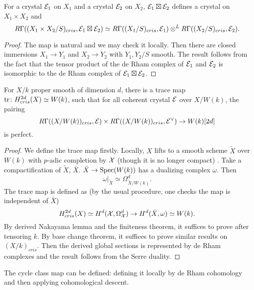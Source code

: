 \begin{theorem}
    For a crystal ${\mathcal {E}}_1$ on $X_1$ and a crystal ${\mathcal {E}}_2$ on $X_2$, 
    ${\mathcal {E}}_1 \boxtimes {\mathcal {E}}_2$ defines a crystal on $X_1\times X_2$ and 
    \[
        R \Gamma ((X_1\times X_2/S)_{cris}, {\mathcal {E}}_1 \boxtimes {\mathcal {E}}_2) \simeq 
        R \Gamma((X_1/S)_{cris}, {\mathcal {E}}_1) \otimes^{L} R \Gamma ((X_2/S)_{cris}, {\mathcal {E}}_2).
    \]
\end{theorem}
\begin{proof}
    The map is natural and we may check it locally. 
    Then there are closed immersions $X_1\to Y_1$ 
    and $X_2\to Y_2$ with $Y_1,Y_2/S$ smooth. 
    The result follows from the fact that 
    the tensor product of the de Rham complex of ${\mathcal {E}}_1$ and ${\mathcal {E}}_2$ 
    is isomorphic to the de Rham complex of ${\mathcal {E}}_1\boxtimes {\mathcal {E}}_2$.
\end{proof}
\begin{theorem}
    For $X/k$ proper smooth of dimension $d$, 
    there is a trace map $\operatorname{tr}\colon H^{2d}_{cris}(X)\simeq W(k)$, 
    such that for all coherent crystal ${\mathcal {E}}$ over $X/W(k)$, the pairing
    \[
        R\Gamma((X/W(k))_{cris}, {\mathcal {E}}) \times 
        R \Gamma((X/W(k))_{cris}, {\mathcal {E}}^\vee) \to W(k)[2d]
    \]
    is perfect.
\end{theorem}
\begin{proof}
    We define the trace map firstly. 
    Locally, $X$ lifts to a smooth scheme $\tilde{X}$ over $W(k)$ 
    with $p$-adic completion by ${\mathcal {X}}$ (though it is no longer compact)
    . Take a compactification of $\tilde{X}$, $\bar{X}$. 
    $\bar{X} \to \operatorname{Spec} (W(k))$ has a dualizing complex $\omega$. 
    Then
    \[
        \omega|_{\tilde{X}} \simeq \Omega_{\tilde{X}/W(k)}^d.
    \]
    The trace map is defined as (by the usual procedure, 
    one checks the map is independent of $\bar{X}$)
    \[
        H^{2d}_{cris}(X) \simeq 
        H^d({\mathcal {X}},\Omega_{{\mathcal {X}}}^d) \to H^d(\bar{X},\omega) \simeq W(k).
    \]
    By derived Nakayama lemma and the finiteness theorem, 
    it suffices to prove after tensoring $k$. By base change theorem, 
    it suffices to prove similar results on $(X/k)_{cris}$. 
    Then the derived global sections is represented by de Rham complexes 
    and the result follows from the Serre duality.
\end{proof}

\begin{remark}
    The cycle class map can be defined: 
    defining it locally by de Rham cohomology 
    and then applying cohomological descent.
\end{remark}

